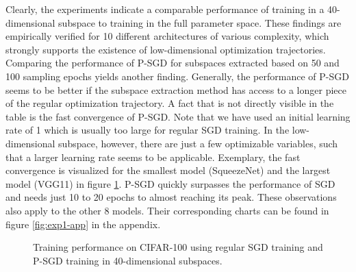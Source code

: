 \documentclass[11pt, a4paper]{article}
\begin{document}
Clearly, the experiments indicate a comparable performance of training in a 40-dimensional subspace to training in the full parameter space. These findings are empirically verified for 10 different architectures of various complexity, which strongly supports the existence of low-dimensional optimization trajectories. Comparing the performance of P-SGD for subspaces extracted based on 50 and 100 sampling epochs yields another finding. Generally, the performance of P-SGD seems to be better if the subspace extraction method has access to a longer piece of the regular optimization trajectory. A fact that is not directly visible in the table is the fast convergence of P-SGD. Note that we have used an initial learning rate of 1 which is usually too large for regular SGD training. In the low-dimensional subspace, however, there are just a few optimizable variables, such that a larger learning rate seems to be applicable. Exemplary, the fast convergence is visualized for the smallest model (SqueezeNet) and the largest model (VGG11) in figure \ref{fig:exp1}. P-SGD quickly surpasses the performance of SGD and needs just 10 to 20 epochs to almost reaching its peak. These observations also apply to the other 8 models. Their corresponding charts can be found in figure \ref{fig:exp1-app} in the appendix.

\begin{figure}[!h]
\centering
{} %
\caption{\centering Training performance on CIFAR-100 using regular SGD training and P-SGD training in 40-dimensional subspaces.}
\label{fig:exp1}
\end{figure}
\end{document}
